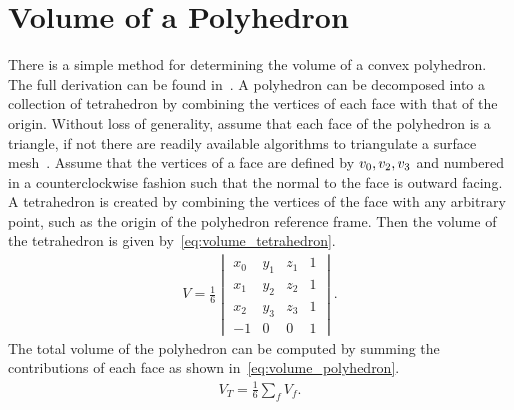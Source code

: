
\chapter{Volume of a Polyhedron}\label{sec:polyhedron_volume}

There is a simple method for determining the volume of a convex polyhedron.
The full derivation can be found in~\textcite{newson1899,orourke1998}.
A polyhedron can be decomposed into a collection of tetrahedron by combining the vertices of each face with that of the origin.
Without loss of generality, assume that each face of the polyhedron is a triangle, if not there are readily available algorithms to triangulate a surface mesh~\cite{berg2008}.
Assume that the vertices of a face are defined by \( v_0, v_2, v_3 \) and numbered in a counterclockwise fashion such that the normal to the face is outward facing.
A tetrahedron is created by combining the vertices of the face with any arbitrary point, such as the origin of the polyhedron reference frame.
Then the volume of the tetrahedron is given by~\cref{eq:volume_tetrahedron}.
\begin{align}\label{eq:volume_tetrahedron}
    V = \frac{1}{6} 
    \begin{vmatrix} 
        x_0 & y_1 & z_1 & 1 \\
        x_1 & y_2 & z_2 & 1 \\
        x_2 & y_3 & z_3 & 1 \\
        -1 & 0 & 0 & 1
    \end{vmatrix}.
\end{align}
The total volume of the polyhedron can be computed by summing the contributions of each face as shown in~\cref{eq:volume_polyhedron}.
\begin{align}\label{eq:volume_polyhedron}
    V_T = \frac{1}{6} \sum_{f} V_f.
\end{align}
